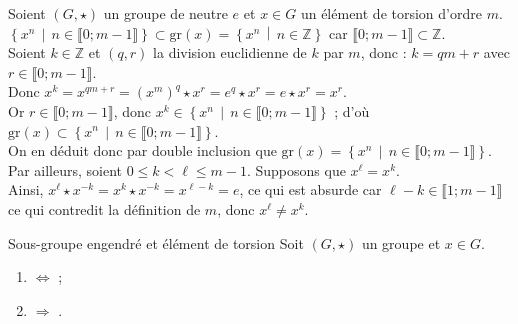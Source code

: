 \documentclass[12pt,a4paper]{report}
\begin{document}
    \begin{demo}[Démonstrations]
    Soient  $(G, \star)$ un groupe de neutre $e$ et $x \in G$ un élément de torsion d'ordre $m$.\\
    $ \left\{ x^n \,\middle|\, n \in \llbracket 0 ; m - 1 \rrbracket \right\} \subset \text{gr}(x) = \left\lbrace x^n \,\middle|\, n \in \mathbb{Z} \right\rbrace $ car $\llbracket 0 ; m - 1 \rrbracket \subset \mathbb{Z} $.\\
    Soient $k \in \mathbb{Z}$ et $(q, r)$ la division euclidienne de $k$ par $m$, donc : $k = qm + r$ avec $r \in \llbracket 0 ; m - 1 \rrbracket$.\\
    Donc $x^k = x^{qm + r} = (x^m)^q \star x^r = e^q \star x^r = e \star x^r = x^r$.\\
    Or $r \in \llbracket 0 ; m - 1 \rrbracket$, donc $x^k \in \left\{ x^n \,\middle|\, n \in \llbracket 0 ; m - 1 \rrbracket \right\}$ ; d'où $\text{gr}(x) \subset \left\{ x^n \,\middle|\, n \in \llbracket 0 ; m - 1 \rrbracket \right\}$.\\
    On en déduit donc par double inclusion que $\text{gr}(x) =  \left\{ x^n \,\middle|\, n \in \llbracket 0 ; m - 1 \rrbracket \right\}$.\\
    Par ailleurs, soient $0 \leqslant k < \ell \leqslant m-1$. Supposons que $x^\ell = x^k$.\\
    Ainsi, $x^\ell \star x^{-k} = x^k \star x^{-k} = x^{\ell - k} = e$, ce qui est absurde car $\ell - k \in \llbracket 1 ; m - 1 \rrbracket$ ce qui contredit la définition de $m$, donc $x^\ell \neq x^k$.
    \end{demo}
    
    \begin{corollaires}{Sous-groupe engendré et élément de torsion}{}
    Soit $(G, \star)$ un groupe et $x \in G$.
    \begin{multicols}{2}
    \begin{enumerate}[label=\bfseries\arabic*)]
        \item {} $\Leftrightarrow$  ;
        \item {} $\Rightarrow$ .
    \end{enumerate}
    \end{multicols}
    \end{corollaires}
    
\end{document}
